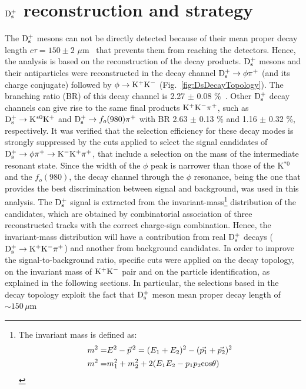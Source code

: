 \section{${\rm D_s^+}$ reconstruction and strategy}
\label{sec:DsRecoStrategy}
The ${\rm D_s^+}$ mesons can not be directly detected because of 
their mean proper decay length $c\tau = 150\pm 2$ $ \mu$m~\cite{Olive:2016xmw} 
that prevents them from reaching the detectors. Hence, the analysis is 
based on the reconstruction of the decay products.
${\rm D_s^+}$ mesons and their antiparticles were 
 reconstructed in the decay channel ${\rm D_s^{+}\to \phi\pi^+}$ 
 (and its charge conjugate) followed by ${\phi \to {\rm K^+ K^-}}$ 
 (Fig.~\ref{fig:DsDecayTopology}). The branching ratio (BR) of this decay channel 
 is 2.27 $\pm$ 0.08 \%~\cite{Olive:2016xmw}.
Other ${\rm D_s^+}$ decay channels can give rise to the same final products
 ${\rm K^+ K^-}\pi^+$, such as ${\rm D_s^+}\rightarrow {\rm  K^{*0} K^+}$ and 
 ${\rm D_s^+}\rightarrow f_o(980) \pi^+$ with BR  2.63 $\pm$ 0.13 \% and 
 1.16 $\pm$ 0.32 \%, respectively. It was verified that the selection efficiency for 
 these decay modes is strongly suppressed by the cuts applied 
 to select the signal candidates of ${\rm D_s^{+}\to \phi\pi^+\to K^-K^+\pi^+}$, that include 
 a selection on the mass of the intermediate resonant state. 
 Since the width of the $\phi$ peak is narrower than those of the 
 K$^{*0}$ and the $f_o(980)$, the decay channel through the 
 $\phi$ resonance, being the one that provides the best discrimination 
 between signal and background, was used in this analysis. 
 The ${\rm D_s^+}$ signal is extracted from 
 the invariant-mass\footnote{The invariant mass is defined as:\\ 
 \begin{align*} m^2 =& E^2 -\vec{p}^{\, 2} = (E_1 + E_2)^2 -(\vec{p_1} + \vec{p_2})^2 \\ m^2 =& m_1^2 +m_2^2 + 2(E_1E_2 -p_1p_2{\rm cos}\theta) \end{align*}} 
 distribution of the candidates, which are obtained by 
 combinatorial association of three reconstructed tracks with the correct 
 charge-sign combination. Hence, 
 the invariant-mass distribution will have a contribution from real 
 ${\rm D_s^+}$ decays (${\rm D^{+}_\mathrm{s}\to K^+ K^-\pi^+}$) and another 
 from background candidates. In order to improve the signal-to-background
ratio, specific cuts were applied on the decay topology, on
   the invariant mass of ${\rm K^+ K^-}$ pair and on the particle identification, 
   as explained in the following sections. 
In particular, the selections based in the decay topology exploit the
fact that ${\rm D_s^+}$ meson mean proper decay length of $\sim 150\, \mu$m  
